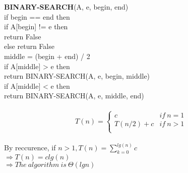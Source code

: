 \documentclass{article}
\begin{document}
\noindent\textbf{BINARY-SEARCH}(A, e, begin, end)\\
\indent if begin == end then\\
\indent \indent if A[begin] != e then \\
\indent \indent \indent return False\\
\indent \indent else return False\\
\indent middle = (begin + end) / 2\\
\indent if A[middle] > e then \\
\indent \indent \indent return BINARY-SEARCH(A, e, begin, middle)\\
\indent if A[middle] < e then\\
\indent \indent \indent return BINARY-SEARCH(A, e, middle, end)\\\\
\begin{equation}
T(n) =
\begin{cases} c &if \ n = 1\\
  T(n/2)  + c &if \ n > 1\\
\end{cases}
\end{equation}\\
\noindent By reccurence, if $n > 1, T(n) = \sum_{k=0}^{lg(n)}c$\\
$\Rightarrow T(n) = clg(n)$\\
$\Rightarrow The \ algorithm \ is \ \Theta(lgn)$
\end{document}
